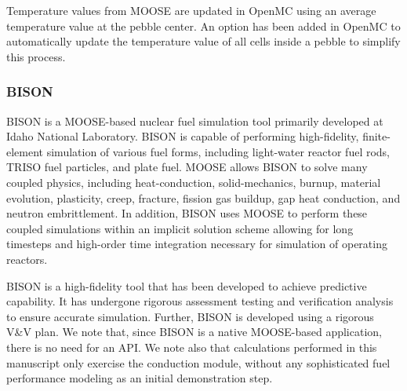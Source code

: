 Temperature values from MOOSE are updated in OpenMC using an average temperature value at the pebble center. An option has been added in OpenMC to automatically update the temperature value of all cells inside a pebble to simplify this process.

\subsubsection{BISON}

BISON is a MOOSE-based \cite{hales2013triso, williamson2012multidimensional} nuclear fuel simulation tool primarily developed at Idaho National Laboratory.
BISON is capable of performing high-fidelity, finite-element simulation of various fuel forms, including
light-water reactor fuel rods, TRISO fuel particles, and plate fuel. MOOSE allows BISON to solve many
coupled physics, including heat-conduction, solid-mechanics, burnup, material evolution, plasticity, creep,
fracture, fission gas buildup, gap heat conduction, and neutron embrittlement. In addition, BISON uses
MOOSE to perform these coupled simulations within an implicit solution scheme allowing for long timesteps
and high-order time integration necessary for simulation of operating reactors.

BISON is a high-fidelity tool that has been developed to achieve predictive capability. It has undergone
rigorous assessment testing and verification analysis to ensure accurate simulation. Further, BISON is
developed using a rigorous V\&V plan. We note that, since BISON is a native MOOSE-based application, there is no need for an API. We note also that calculations performed in this manuscript only exercise the conduction module, without any sophisticated fuel performance modeling as an initial demonstration step.
